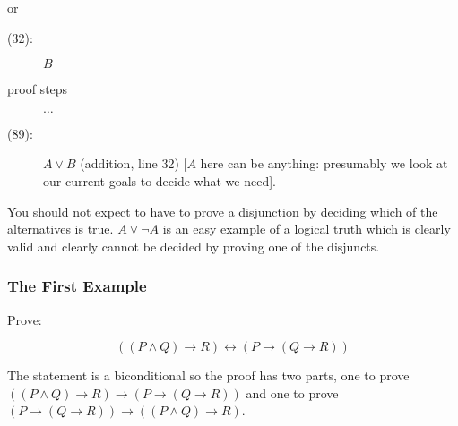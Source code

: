 \documentclass[12pt]{article}
\begin{document}
or 

\begin{description}

\item[(32):]  $B$

\item[proof steps] $\ldots$ 

\item[(89):] $A \vee B$  (addition, line 32)  [$A$ here can be anything:  presumably we look at our current goals to decide what we need].




\end{description}


You should not expect to have to prove a disjunction by deciding which of the alternatives is true.  $A \vee \neg A$ is an easy example of a logical truth which is clearly valid and clearly cannot be decided by proving one of the disjuncts.

\newpage

\subsubsection{The First Example}

Prove:

$$((P \wedge Q) \rightarrow R) \leftrightarrow (P \rightarrow (Q \rightarrow R))$$

The statement is a biconditional so the proof has two parts, one to
prove $((P \wedge Q) \rightarrow R) \rightarrow (P \rightarrow (Q
\rightarrow R))$ and one to prove $(P \rightarrow (Q \rightarrow R))
\rightarrow ((P \wedge Q) \rightarrow R)$.
\end{document}
